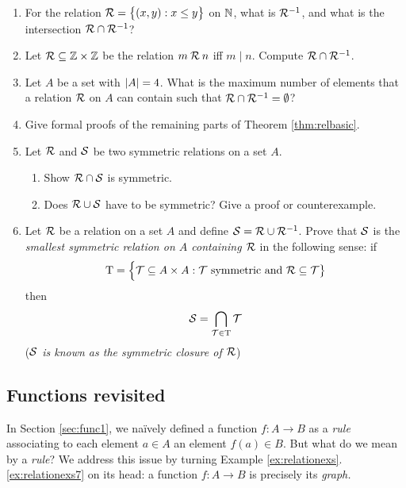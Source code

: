 \begin{exercises}{}{}
\begin{enumerate}
  
  \item For the relation $\mathcal{R}=\bigl\{(x,y):x\le y\bigr\}$ on $\mathbb{N}$, what is $\mathcal{R}^{-1}$, and what is the intersection $\mathcal{R}\cap\mathcal{R}^{-1}$?
	
	
	\item Let $\mathcal{R} \subseteq \mathbb{Z}\times\mathbb{Z}$ be the relation $m\mathbin{\mathcal{R}} n$ iff $m\mid n$. Compute $\mathcal{R}\cap\mathcal{R}^{-1}$.
  

  \item Let $A$ be a set with $\left| A\right|=4$. What is the maximum number of elements that a relation $\mathcal{R}$ on $A$ can contain such that $\mathcal{R}\cap \mathcal{R}^{-1}=\emptyset$?
   
  
  \item Give formal proofs of the remaining parts of Theorem \ref{thm:relbasic}.
  
    
  \item Let $\mathcal{R}$ and $\mathcal{S}$ be two symmetric relations on a set $A$. 
	\begin{enumerate}
    \item Show $\mathcal{R} \cap \mathcal{S}$ is symmetric.
    \item Does $\mathcal{R} \cup \mathcal{S}$ have to be symmetric? Give a proof or counterexample.
	\end{enumerate}
  
  
  \item Let $\mathcal{R}$ be a relation on a set $A$ and define $\mathcal{S}=\mathcal{R}\cup\mathcal{R}^{-1}$. Prove that $\mathcal{S}$ is the \emph{smallest symmetric relation on $A$ containing $\mathcal{R}$} in the following sense: if
  \[
  	\mathrm T=\Bigl\{\mathcal T\subseteq A\times A:\mathcal T\text{ symmetric and }\mathcal{R}\subseteq\mathcal T\bigr\}
  \]
  then
  \[
  	\mathcal{S}=\bigcap\limits_{\mathcal T\in \mathrm T} \mathcal T
  \]
  (\emph{$\mathcal{S}$ is known as the \emph{symmetric closure} of $\mathcal{R}$})
\end{enumerate}

\end{exercises}

\clearpage



\subsection{Functions revisited}\label{sec:func2}

In Section \ref{sec:func1}, we naïvely defined a function $f:A\to B$ as a \emph{rule} associating to each element $a\in A$ an element $f(a)\in B$. But what do we mean by a \emph{rule}? We address this issue by turning Example \ref*{ex:relationexs}.\ref{ex:relationexs7} on its head: a function $f:A\to B$ is precisely its \emph{graph.}

